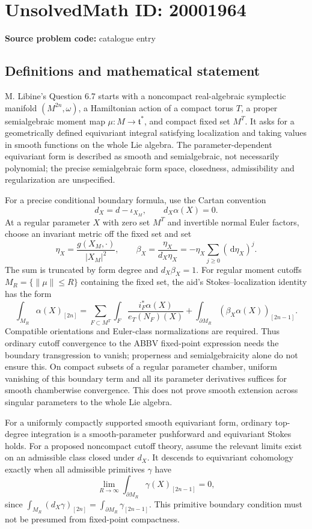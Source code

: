 \documentclass[11pt]{article}
\newcommand{\dd}{\,\mathrm{d}}
\begin{document}
\section*{UnsolvedMath ID: 20001964}
\textbf{Source problem code:} catalogue entry
\subsection{Definitions and mathematical statement}
M. Libine's Question 6.7 starts with a noncompact real-algebraic symplectic manifold \((M^{2n},\omega)\), a Hamiltonian action of a compact torus \(T\), a proper semialgebraic moment map \(\mu:M\to\mathfrak t^*\), and compact fixed set \(M^T\). It asks for a geometrically defined equivariant integral satisfying localization and taking values in smooth functions on the whole Lie algebra. The parameter-dependent equivariant form is described as smooth and semialgebraic, not necessarily polynomial; the precise semialgebraic form space, closedness, admissibility and regularization are unspecified.

For a precise conditional boundary formula, use the Cartan convention
\[
 d_X=d-\iota_{X_M},\qquad d_X\alpha(X)=0.
\]
At a regular parameter \(X\) with zero set \(M^T\) and invertible normal Euler factors, choose an invariant metric off the fixed set and set
\[
 \eta_X=\frac{g(X_M,\cdot)}{|X_M|^2},\qquad
 \beta_X=\frac{\eta_X}{d_X\eta_X}
       =-\eta_X\sum_{j\geq0}(\dd\eta_X)^j.
\]
The sum is truncated by form degree and \(d_X\beta_X=1\). For regular moment cutoffs \(M_R=\{\|\mu\|\leq R\}\) containing the fixed set, the aid's Stokes--localization identity has the form
\[
 \int_{M_R}\alpha(X)_{[2n]}
 =\sum_{F\subset M^T}\int_F
       \frac{i_F^*\alpha(X)}{e_T(N_F)(X)}
 +\int_{\partial M_R}(\beta_X\alpha(X))_{[2n-1]}.
\]
Compatible orientations and Euler-class normalizations are required. Thus ordinary cutoff convergence to the ABBV fixed-point expression needs the boundary transgression to vanish; properness and semialgebraicity alone do not ensure this. On compact subsets of a regular parameter chamber, uniform vanishing of this boundary term and all its parameter derivatives suffices for smooth chamberwise convergence. This does not prove smooth extension across singular parameters to the whole Lie algebra.

For a uniformly compactly supported smooth equivariant form, ordinary top-degree integration is a smooth-parameter pushforward and equivariant Stokes holds. For a proposed noncompact cutoff theory, assume the relevant limits exist on an admissible class closed under \(d_X\). It descends to equivariant cohomology exactly when all admissible primitives \(\gamma\) have
\[
 \lim_{R\to\infty}\int_{\partial M_R}\gamma(X)_{[2n-1]}=0,
\]
since \(\int_{M_R}(d_X\gamma)_{[2n]}
=\int_{\partial M_R}\gamma_{[2n-1]}\). This primitive boundary condition must not be presumed from fixed-point compactness.
\end{document}
